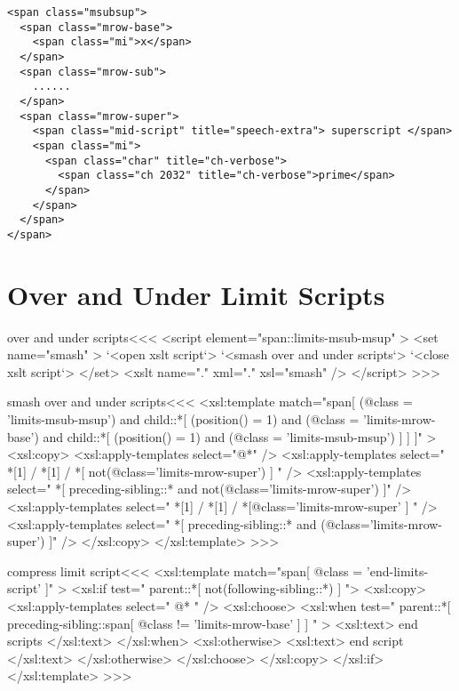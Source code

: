 \documentclass{article}
\begin{document}
\begin{verbatim}
<span class="msubsup"> 
  <span class="mrow-base"> 
    <span class="mi">x</span> 
  </span> 
  <span class="mrow-sub"> 
    ......
  </span> 
  <span class="mrow-super"> 
    <span class="mid-script" title="speech-extra"> superscript </span> 
    <span class="mi"> 
      <span class="char" title="ch-verbose"> 
        <span class="ch 2032" title="ch-verbose">prime</span> 
      </span> 
    </span> 
  </span> 
</span> 
\end{verbatim}


\section{Over and Under Limit Scripts}


\<over and under scripts\><<<
<script element="span::limits-msub-msup" >
  <set name="smash" >
     `<open xslt script`>
     `<smash over and under scripts`>
     `<close xslt script`>
  </set>
  <xslt name="." xml="." xsl="smash" />
</script> 
>>>

\<smash over and under scripts\><<<
<xsl:template match="span[
       (@class = 'limits-msub-msup')
     and
       child::*[ (position() = 1) 
                 and (@class = 'limits-mrow-base')
                 and child::*[ (position() = 1) 
                         and (@class = 'limits-msub-msup')
       ]             ]
]" >
  <xsl:copy>
     <xsl:apply-templates select="@*" />
     <xsl:apply-templates select="
                   *[1]
                   / *[1] 
                   / *[ not(@class='limits-mrow-super') ]  " />
     <xsl:apply-templates select=" *[
                   preceding-sibling::* 
                 and
                   not(@class='limits-mrow-super') ]" />
     <xsl:apply-templates select="
                   *[1]
                   / *[1]
                   / *[@class='limits-mrow-super' ]  " />
     <xsl:apply-templates select=" *[
                   preceding-sibling::* 
                 and
                   (@class='limits-mrow-super') ]" />
  </xsl:copy>
</xsl:template> 
>>>


\<compress limit script\><<<
<xsl:template match="span[ @class = 'end-limits-script' ]" >
  <xsl:if test=" parent::*[ not(following-sibling::*) ] ">
    <xsl:copy>
       <xsl:apply-templates select=" @* " />
       <xsl:choose>
          <xsl:when test="  
                parent::*[ preceding-sibling::span[
                                  @class != 'limits-mrow-base'
                         ]  ]
            " >
            <xsl:text> end scripts </xsl:text>
          </xsl:when>
          <xsl:otherwise>
            <xsl:text> end script </xsl:text>
          </xsl:otherwise>
       </xsl:choose>
    </xsl:copy>
  </xsl:if>
</xsl:template> 
>>>
\end{document}
